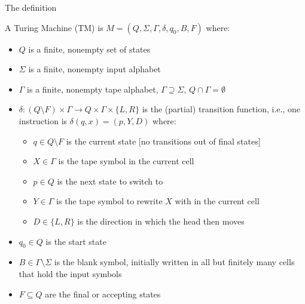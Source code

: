 \documentclass[handout]{beamer}
\begin{document}
\begin{frame}{The definition}

    A \alert{Turing Machine (TM)} is $M=(Q,\Sigma,\Gamma,\delta,q_0,B,F)$ where:
    
    \begin{itemize}
        \item $Q$ is a finite, nonempty set of \alert{states}
        \item $\Sigma$ is a finite, nonempty \alert{input alphabet} 
        \item $\Gamma$ is a finite, nonempty \alert{tape alphabet}, $\Gamma \supseteq \Sigma$, $Q\cap \Gamma=\emptyset$
        \item $\delta\colon(Q\setminus F)\times\Gamma\rightarrow Q\times \Gamma\times \{L,R\}$ is the (partial) \alert{transition function}, i.e., one instruction is $\delta(q,x)=(p,Y,D)$ where:
        \begin{itemize}
            \item $q\in Q\setminus F$ is the current state [no transitions out of final states]
            \item $X\in\Gamma$ is the tape symbol in the current cell
            \item $p\in Q$ is the next state to switch to
            \item $Y\in \Gamma$ is the tape symbol to rewrite $X$ with in the current cell
            \item $D\in \{L,R\}$ is the \alert{direction} in which the head then moves
        \end{itemize}
        \item $q_0\in Q$ is the \alert{start state}
        \item $B\in\Gamma\setminus\Sigma$ is the \alert{blank symbol}, initially written in all but finitely many cells that hold the input symbols
        \item $F\subseteq Q$ are the \alert{final} or \alert{accepting} states
    \end{itemize}

\end{frame}
\end{document}
